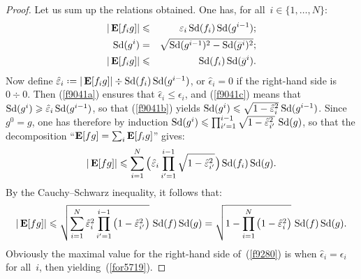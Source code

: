 \begin{proof}
Let us sum up the relations obtained.
One has, for all~$i\in\{1,\ldots,N\}$:
\begin{eqnarray}
\label{f9041a} |\EE[f_ig]| & \leq & \epsilon_i \ecty(f_i) \ecty(g^{i-1}) ; \\
\label{f9041b} \ecty(g^i) & = & \sqrt{\ecty(g^{i-1})^2 - \ecty(\bar{g}^i)^2} ; \\
\label{f9041c} |\EE[f_ig]| & \leq & \ecty(f_i) \ecty(\bar{g}^i) .
\end{eqnarray}
%
Now define $\hat\epsilon_i \coloneqq |\EE[f_ig]| \div \ecty(f_i)\ecty(g^{i-1})$,
or $\hat\epsilon_i = 0$ if the right-hand side is $0 \div 0$.
Then (\ref{f9041a}) ensures that $\hat\epsilon_i \leq \epsilon_i$,
and (\ref{f9041c}) means that $\ecty(\bar{g}^i) \geq \hat\epsilon_i\ecty(g^{i-1})$,
so that (\ref{f9041b}) yields $\ecty(g^i) \leq \sqrt{1-\hat\epsilon_i^2} \*
\hspace{.056em} \ecty(g^{i-1})$.
Since $g^0 = g$, one has therefore by induction
$\ecty(g^i) \leq \prod_{i'=1}^{i-1} \ab \sqrt{1-\hat\epsilon_{i'}^2} \,\ecty(g)$,
so that the decomposition ``$\mathop{\smash{\mathbf{E}}}\nolimits[fg]=\sum_i\mathop{\smash{\mathbf{E}}}\nolimits[f_ig]$'' gives:
\[\label{f8485} |\EE[fg]| \leq \sum_{i=1}^N
\Big( \hat\epsilon_i \prod_{i'=1}^{i-1} \sqrt{1-\hat\epsilon_{i'}^2} \Big)
\ecty(f_i) \ecty(g) .\]
By the Cauchy--Schwarz inequality, it follows that:
\[\label{f9280} |\EE[fg]| \leq \sqrt{\sum_{i=1}^N \hat\epsilon_i^2
\prod_{i'=1}^{i-1} \big(1-\hat\epsilon_{i'}^2 \big)} \, \ecty(f)\ecty(g)
= \sqrt{1-\prod_{i=1}^N \big(1-\hat\epsilon_i^2\big)} \, \ecty(f)\ecty(g) .\]
%
Obviously the maximal value for the right-hand side of~(\ref{f9280})
is when $\hat\epsilon_i = \epsilon_i$ for all~$i$,
then yiel\mbox{di}ng~(\ref{for5719}).
\end{proof}

